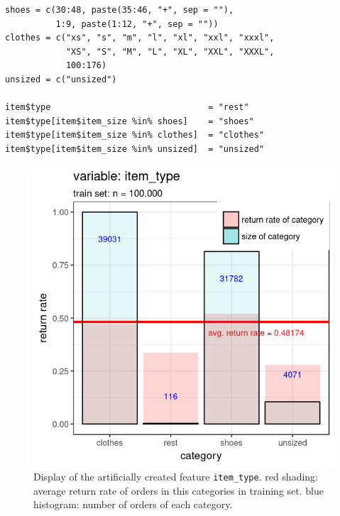 \documentclass[a4paper,12pt]{article}
\begin{document}
\begin{lstlisting}
shoes = c(30:48, paste(35:46, "+", sep = ""),
          1:9, paste(1:12, "+", sep = ""))
clothes = c("xs", "s", "m", "l", "xl", "xxl", "xxxl",
            "XS", "S", "M", "L", "XL", "XXL", "XXXL",
            100:176)
unsized = c("unsized")

item$type                               = "rest"
item$type[item$item_size %in% shoes]    = "shoes"
item$type[item$item_size %in% clothes]  = "clothes"
item$type[item$item_size %in% unsized]  = "unsized"

\end{lstlisting}

\begin{figure}
  \begin{minipage}[c]{0.55\textwidth}
    \includegraphics[width=\textwidth]{pictures/item_type.png}
  \end{minipage}\hfill
  \begin{minipage}[c]{0.4\textwidth}
    \caption{Display of the artificially created feature \texttt{item\_type}. red shading: average return rate of orders in this categories in training set. blue histogram: number of orders of each category.}
    \label{Figure::ItemType}
  \end{minipage}
\end{figure}
\end{document}
